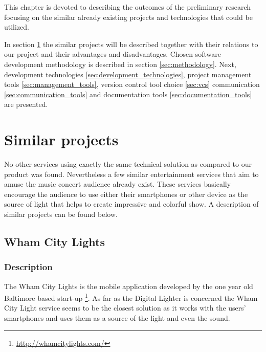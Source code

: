 This chapter is devoted to describing the outcomes of the preliminary research focusing on the similar already existing projects and technologies that could be utilized.

In section \ref{sec:similar_projects} the similar projects will be described together with their relations to our project and their advantages and disadvantages.
Chosen software development methodology is described in section \ref{sec:methodology}.
Next, development technologies \ref{sec:development_technologies}, project management tools \ref{sec:management_tools}, version control tool choice \ref{sec:vcs} communication \ref{sec:communication_tools} and documentation tools \ref{sec:documentation_tools} are presented.


\section{Similar projects} \label{sec:similar_projects}
No other services using exactly the same technical solution as compared to our product was found.
Nevertheless a few similar entertainment services that aim to amuse the music concert audience already exist. 
These services basically encourage the audience to use either their smartphones or other device as the source of light that helps to create impressive and colorful show.
A description of similar projects can be found below.


\subsection{Wham City Lights}

\subsubsection{Description}
The Wham City Lights is the mobile application developed by the one year old Baltimore based start-up \footnote{\url{http://whamcitylights.com/}}. 
As far as the Digital Lighter is concerned the Wham City Light service seems to be the closest solution as it works with the users' smartphones and uses them as a source of the light and even the sound.

